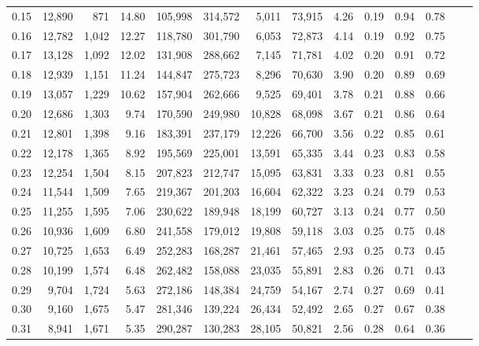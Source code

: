 \begin{tabular}{rrrrrrrrrrrrrr}
0.15 &  12,890 &    871 &   14.80 &  105,998 &  314,572 &   5,011 &  73,915 &  4.26 &  0.19 &  0.94 &      0.78 \\
0.16 &  12,782 &  1,042 &   12.27 &  118,780 &  301,790 &   6,053 &  72,873 &  4.14 &  0.19 &  0.92 &      0.75 \\
0.17 &  13,128 &  1,092 &   12.02 &  131,908 &  288,662 &   7,145 &  71,781 &  4.02 &  0.20 &  0.91 &      0.72 \\
0.18 &  12,939 &  1,151 &   11.24 &  144,847 &  275,723 &   8,296 &  70,630 &  3.90 &  0.20 &  0.89 &      0.69 \\
0.19 &  13,057 &  1,229 &   10.62 &  157,904 &  262,666 &   9,525 &  69,401 &  3.78 &  0.21 &  0.88 &      0.66 \\
0.20 &  12,686 &  1,303 &    9.74 &  170,590 &  249,980 &  10,828 &  68,098 &  3.67 &  0.21 &  0.86 &      0.64 \\
0.21 &  12,801 &  1,398 &    9.16 &  183,391 &  237,179 &  12,226 &  66,700 &  3.56 &  0.22 &  0.85 &      0.61 \\
0.22 &  12,178 &  1,365 &    8.92 &  195,569 &  225,001 &  13,591 &  65,335 &  3.44 &  0.23 &  0.83 &      0.58 \\
0.23 &  12,254 &  1,504 &    8.15 &  207,823 &  212,747 &  15,095 &  63,831 &  3.33 &  0.23 &  0.81 &      0.55 \\
0.24 &  11,544 &  1,509 &    7.65 &  219,367 &  201,203 &  16,604 &  62,322 &  3.23 &  0.24 &  0.79 &      0.53 \\
0.25 &  11,255 &  1,595 &    7.06 &  230,622 &  189,948 &  18,199 &  60,727 &  3.13 &  0.24 &  0.77 &      0.50 \\
0.26 &  10,936 &  1,609 &    6.80 &  241,558 &  179,012 &  19,808 &  59,118 &  3.03 &  0.25 &  0.75 &      0.48 \\
0.27 &  10,725 &  1,653 &    6.49 &  252,283 &  168,287 &  21,461 &  57,465 &  2.93 &  0.25 &  0.73 &      0.45 \\
0.28 &  10,199 &  1,574 &    6.48 &  262,482 &  158,088 &  23,035 &  55,891 &  2.83 &  0.26 &  0.71 &      0.43 \\
0.29 &   9,704 &  1,724 &    5.63 &  272,186 &  148,384 &  24,759 &  54,167 &  2.74 &  0.27 &  0.69 &      0.41 \\
0.30 &   9,160 &  1,675 &    5.47 &  281,346 &  139,224 &  26,434 &  52,492 &  2.65 &  0.27 &  0.67 &      0.38 \\
0.31 &   8,941 &  1,671 &    5.35 &  290,287 &  130,283 &  28,105 &  50,821 &  2.56 &  0.28 &  0.64 &      0.36 \\

\end{tabular}

